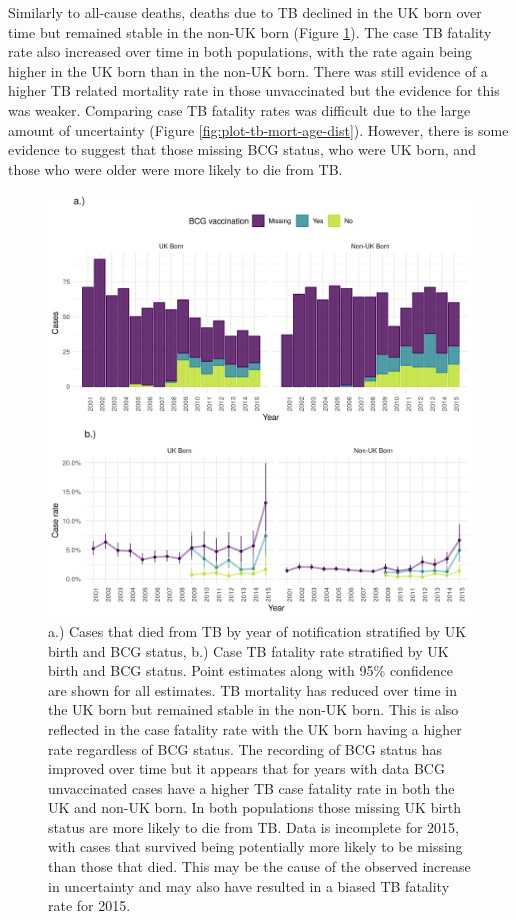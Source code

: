 \documentclass[11pt,twoside]{bristolthesis}
\begin{document}
  Similarly to all-cause deaths, deaths due to TB declined in the UK born over time but remained stable in the non-UK born (Figure \ref{fig:plot-tb-mort-case-rate}). The case TB fatality rate also increased over time in both populations, with the rate again being higher in the UK born than in the non-UK born. There was still evidence of a higher TB related mortality rate in those unvaccinated but the evidence for this was weaker. Comparing case TB fatality rates was difficult due to the large amount of uncertainty (Figure \ref{fig:plot-tb-mort-age-dist}). However, there is some evidence to suggest that those missing BCG status, who were UK born, and those who were older were more likely to die from TB.
  \begin{figure}
  
  {\centering \includegraphics[width=0.8\linewidth,]{chapters/tb-epi-england/figures/plot-tb-mort-case-rate} 
  
  }
  
  \caption[a.) Cases that died from TB by year of notification stratified by UK birth and BCG status, b.) Case TB fatality rate stratified by UK birth and BCG status.]{a.) Cases that died from TB by year of notification stratified by UK birth and BCG status, b.) Case TB fatality rate stratified by UK birth and BCG status. Point estimates along with 95\% confidence are shown for all estimates. TB mortality has reduced over time in the UK born but remained stable in the non-UK born. This is also reflected in the case fatality rate with the UK born having a higher rate regardless of BCG status. The recording of BCG status has improved over time but it appears that for years with data BCG unvaccinated cases have a higher TB case fatality rate in both the UK and non-UK born. In both populations those missing UK birth status are more likely to die from TB. Data is incomplete for 2015, with cases that survived being potentially more likely to be missing than those that died. This may be the cause of the observed increase in uncertainty and may also have resulted in a biased TB fatality rate for 2015.}\label{fig:plot-tb-mort-case-rate}
  \end{figure}
\end{document}
